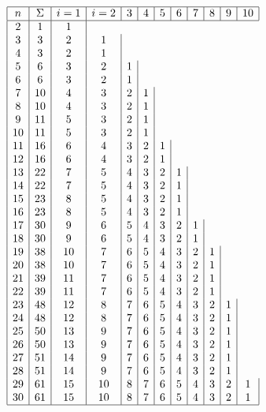       \begin{displaymath}
\begin {array}{|c|c|c|c|c|c|c|c|c|c|c|c|} 
\hline
n & \Sigma & i=1 & i=2 & 3 & 4 & 5 & 6 & 7 & 8 &9 & 10\\ \hline
2&1&1
\\3&3&2&1
\\4&3&2&1
\\5&6&3&2&1
\\6&6&3&2&1
\\7&10&4&3&2&1
\\8&10&4&3&2&1
\\9&11&5&3&2&1
\\10&11&5&3&2&1
\\11&16&6&4&3&2&1
\\12&16&6&4&3&2&1
\\13&22&7&5&4&3&2&1
\\14&22&7&5&4&3&2&1
\\15&23&8&5&4&3&2&1
\\16&23&8&5&4&3&2&1
\\17&30&9&6&5&4&3&2&1
\\18&30&9&6&5&4&3&2&1
\\19&38&10&7&6&5&4&3&2&1
\\20&38&10&7&6&5&4&3&2&1 \\
21 & 39 & 11 & 7 & 6 & 5  & 4 & 3 & 2 & 1\\
22 & 39 & 11 & 7 & 6 & 5  & 4 & 3 & 2 & 1\\
23 & 48 & 12 & 8 & 7 & 6 & 5 & 4 & 3 & 2 & 1 \\
24 & 48 & 12 & 8 & 7 & 6 & 5 & 4 & 3 & 2 & 1 \\
25 & 50 & 13 & 9 & 7 & 6 & 5 & 4 & 3 & 2 & 1 \\
26 & 50 & 13 & 9 & 7 & 6 & 5 & 4 & 3 & 2 & 1 \\
27 & 51 & 14& 9 & 7 & 6 & 5 & 4 & 3 & 2 & 1 \\
28 & 51 & 14& 9 & 7 & 6 & 5 & 4 & 3 & 2 & 1 \\
29 & 61 & 15 & 10 & 8 & 7 & 6 & 5 & 4 & 3 & 2 & 1 \\
30 & 61 & 15 & 10 & 8 & 7 & 6 & 5 & 4 & 3 & 2 & 1 \\ \hline
\end {array}
      \end{displaymath}
